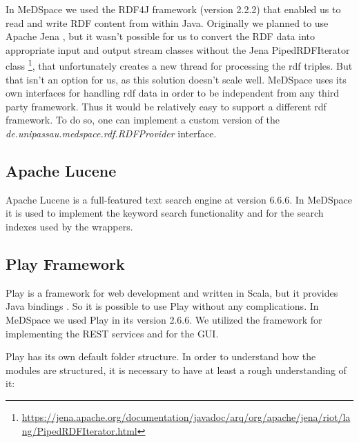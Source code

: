 In MeDSpace we used the RDF4J framework (version 2.2.2) \cite{RDF4J} that enabled us to read and write RDF content from within Java. Originally we planned to use Apache Jena \cite{Jena}, but it wasn't possible for us to convert the RDF data into appropriate input and output stream classes without the Jena PipedRDFIterator class \footnote{\url{https://jena.apache.org/documentation/javadoc/arq/org/apache/jena/riot/lang/PipedRDFIterator.html}}, that unfortunately creates a new thread for processing the rdf triples. But that isn't an option for us, as this solution doesn't scale well. 
MeDSpace uses its own interfaces for handling rdf data in order to be independent from any third party framework. Thus it would be relatively easy to support a different rdf framework. To do so, one can implement a custom version of the \emph{de.unipassau.medspace.rdf.RDFProvider} interface. 

\subsection{Apache Lucene}

Apache Lucene is a full-featured text search engine \cite{LuceneCore} at version 6.6.6. In MeDSpace it is used to implement the keyword search functionality and for the search indexes used by the wrappers.

\subsection{Play Framework}

Play is a framework for web development and written in Scala, but it provides Java bindings \cite{Play}. So it is possible to use Play without any complications. In MeDSpace we used Play in its version 2.6.6. We utilized the framework for implementing the REST services and for the GUI. 

Play has its own default folder structure. In order to understand how the modules are structured, it is necessary to have at least a rough understanding of it:

